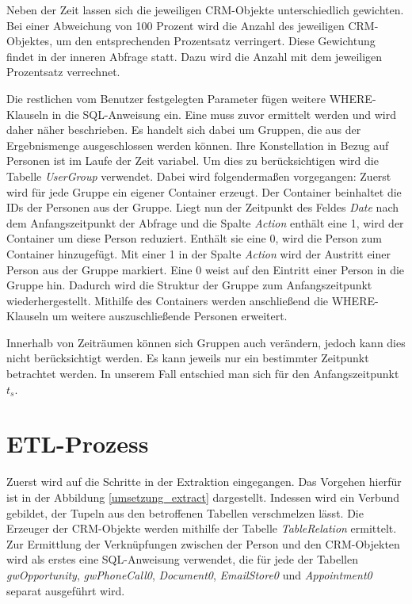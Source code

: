 Neben der Zeit lassen sich die jeweiligen CRM-Objekte unterschiedlich gewichten. Bei einer Abweichung von 100 Prozent wird die Anzahl des jeweiligen CRM-Objektes, um den entsprechenden Prozentsatz verringert. Diese Gewichtung findet in der inneren Abfrage statt. Dazu wird die Anzahl mit dem jeweiligen Prozentsatz verrechnet.

Die restlichen vom Benutzer festgelegten Parameter fügen weitere WHERE-Klauseln in die SQL-Anweisung ein. Eine muss zuvor ermittelt werden und wird daher näher beschrieben. Es handelt sich dabei um Gruppen, die aus der Ergebnismenge ausgeschlossen werden können. Ihre Konstellation in Bezug auf Personen ist im Laufe der Zeit variabel. Um dies zu berücksichtigen wird die Tabelle \textit{UserGroup} verwendet. Dabei wird folgendermaßen vorgegangen: Zuerst wird für jede Gruppe ein eigener Container erzeugt. Der Container beinhaltet die IDs der Personen aus der Gruppe. Liegt nun der Zeitpunkt des Feldes \textit{Date} nach dem Anfangszeitpunkt der Abfrage und die Spalte \textit{Action} enthält eine 1, wird der Container um diese Person reduziert. Enthält sie eine 0, wird die Person zum Container hinzugefügt. Mit einer 1 in der Spalte \textit{Action} wird der Austritt einer Person aus der Gruppe markiert. Eine 0 weist auf den Eintritt einer Person in die Gruppe hin. Dadurch wird die Struktur der Gruppe zum Anfangszeitpunkt wiederhergestellt. Mithilfe des Containers werden anschließend die WHERE-Klauseln um weitere auszuschließende Personen erweitert.

Innerhalb von Zeiträumen können sich Gruppen auch verändern, jedoch kann dies nicht berücksichtigt werden. Es kann jeweils nur ein bestimmter Zeitpunkt betrachtet werden. In unserem Fall entschied man sich für den Anfangszeitpunkt $t_{s}$.

\section{ETL-Prozess}

Zuerst wird auf die Schritte in der Extraktion eingegangen. Das Vorgehen hierfür ist in der Abbildung \ref{umsetzung_extract} dargestellt. Indessen wird ein Verbund gebildet, der Tupeln aus den betroffenen Tabellen verschmelzen lässt. Die Erzeuger der CRM-Objekte werden mithilfe der Tabelle \textit{TableRelation} ermittelt. Zur Ermittlung der Verknüpfungen zwischen der Person und den CRM-Objekten wird als erstes eine SQL-Anweisung verwendet, die für jede der Tabellen \textit{gwOpportunity}, \textit{gwPhoneCall0}, \textit{Document0}, \textit{EmailStore0} und \textit{Appointment0} separat ausgeführt wird. 

